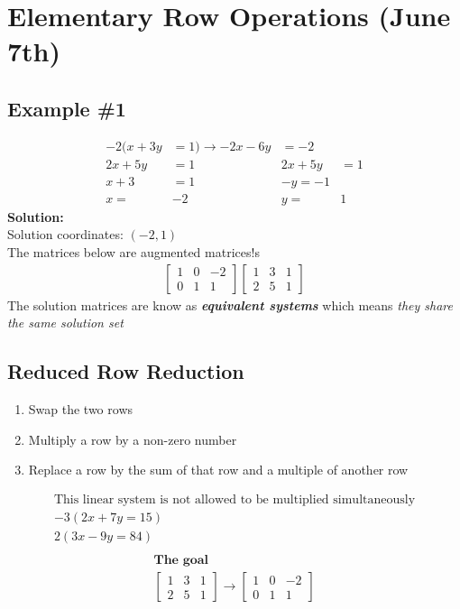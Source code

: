 \documentclass[11pt]{article} %
\begin{document}
\section*{Elementary Row Operations (June 7th)}
\subsection*{Example \#1}
\begin{align*}
-2(x + 3y &= 1) \rightarrow -2x - 6y &= -2 \\
2x + 5y &= 1 & 2x + 5y &=1 \\
x + 3 &= 1 & -y = -1 \\
x =& -2 & y =& 1
\end{align*}
\textbf{Solution:} \\
Solution coordinates: $(-2 , 1)$\\
The matrices below are augmented matrices!s
\begin{align*}
\begin{bmatrix}
1 & 0 & -2 \\
0 & 1 & 1
\end{bmatrix}
\begin{bmatrix}
1 & 3 & 1 \\
2 & 5 & 1
\end{bmatrix}
\end{align*}
The solution matrices are know as \textbf{\textit{equivalent systems}} which means \textit{they share the same solution set}

\subsection*{Reduced Row Reduction}
\begin{enumerate}
\item Swap the two rows
\item Multiply a row by a non-zero number
\item Replace a row by the sum of that row and a multiple of another row
\end{enumerate}

\begin{align*}
\text{This linear system is not allowed to be multiplied simultaneously} \\
-3(2x + 7y = 15) \\
2(3x - 9y = 84) \\
\end{align*}
\begin{gather*}
\textbf{The goal} \\
\begin{bmatrix}
1 & 3 & 1 \\
2 & 5 & 1
\end{bmatrix} \rightarrow
\begin{bmatrix}
1 & 0 & -2 \\
0 & 1 & 1
\end{bmatrix}
\end{gather*}
\end{document}
